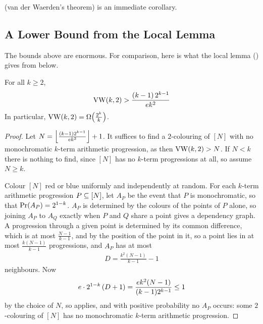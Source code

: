  (van der Waerden's theorem) is an immediate corollary.

\subsection{A Lower Bound from the Local Lemma}

The bounds above are enormous. For comparison, here is what the \Lovasz{} local lemma () gives from below.

\begin{boxproposition} \label{Ch6:Prop:VW_Lower_Bound}
    For all $k \geq 2$,
    \begin{align*}
        \operatorname{VW}\!\left( k, 2 \right) > \frac{(k - 1) \, 2^{k - 1}}{e k^2}
    \end{align*}
    In particular, $\operatorname{VW}\!\left( k, 2 \right) = \Omega\!\left( \frac{2^k}{k} \right)$.
\end{boxproposition}
\begin{proof}
    Let $N = \left\lfloor \frac{(k - 1) 2^{k - 1}}{e k^2} \right\rfloor + 1$. It suffices to find a $2$-colouring of $[N]$ with no monochromatic $k$-term arithmetic progression, as then $\operatorname{VW}(k, 2) > N$. If $N < k$ there is nothing to find, since $[N]$ has no $k$-term progressions at all, so assume $N \geq k$.

    Colour $[N]$ red or blue uniformly and independently at random. For each $k$-term arithmetic progression $P \subseteq [N]$, let $A_P$ be the event that $P$ is monochromatic, so that $\Pr\!\left( A_P \right) = 2^{1 - k}$. $A_P$ is determined by the colours of the points of $P$ alone, so joining $A_P$ to $A_Q$ exactly when $P$ and $Q$ share a point gives a dependency graph. A progression through a given point is determined by its common difference, which is at most $\frac{N - 1}{k - 1}$, and by the position of the point in it, so a point lies in at most $\frac{k (N - 1)}{k - 1}$ progressions, and $A_P$ has at most
    \begin{align*}
        D = \frac{k^2 (N - 1)}{k - 1} - 1
    \end{align*}
    neighbours. Now
    \begin{align*}
        e \cdot 2^{1 - k} \left( D + 1 \right) = \frac{e k^2 (N - 1)}{(k - 1) 2^{k - 1}} \leq 1
    \end{align*}
    by the choice of $N$, so  applies, and with positive probability no $A_P$ occurs: some $2$-colouring of $[N]$ has no monochromatic $k$-term arithmetic progression.
\end{proof}
